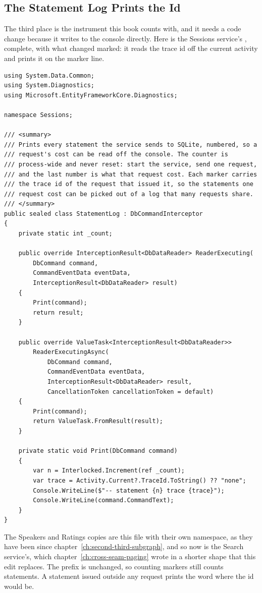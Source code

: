 \subsection{The Statement Log Prints the Id}

%
The third place is the instrument this book counts with, and it needs a code
change because it writes to the console directly. Here is the Sessions
service's , complete, with what changed marked: it reads
the trace id off the current activity and prints it on the marker line.

\begin{verbatim}
using System.Data.Common;
using System.Diagnostics;
using Microsoft.EntityFrameworkCore.Diagnostics;

namespace Sessions;

/// <summary>
/// Prints every statement the service sends to SQLite, numbered, so a
/// request's cost can be read off the console. The counter is
/// process-wide and never reset: start the service, send one request,
/// and the last number is what that request cost. Each marker carries
/// the trace id of the request that issued it, so the statements one
/// request cost can be picked out of a log that many requests share.
/// </summary>
public sealed class StatementLog : DbCommandInterceptor
{
    private static int _count;

    public override InterceptionResult<DbDataReader> ReaderExecuting(
        DbCommand command,
        CommandEventData eventData,
        InterceptionResult<DbDataReader> result)
    {
        Print(command);
        return result;
    }

    public override ValueTask<InterceptionResult<DbDataReader>>
        ReaderExecutingAsync(
            DbCommand command,
            CommandEventData eventData,
            InterceptionResult<DbDataReader> result,
            CancellationToken cancellationToken = default)
    {
        Print(command);
        return ValueTask.FromResult(result);
    }

    private static void Print(DbCommand command)
    {
        var n = Interlocked.Increment(ref _count);
        var trace = Activity.Current?.TraceId.ToString() ?? "none";
        Console.WriteLine($"-- statement {n} trace {trace}");
        Console.WriteLine(command.CommandText);
    }
}
\end{verbatim}

%
The Speakers and Ratings copies are this file with their own namespace, as
they have been since chapter~\ref{ch:second-third-subgraph}, and so now is the
Search service's, which chapter~\ref{ch:cross-seam-paging} wrote in a shorter
shape that this edit replaces. The prefix  is unchanged, so
counting markers still counts statements. A statement issued outside any
request prints the word  where the id would be.
%

